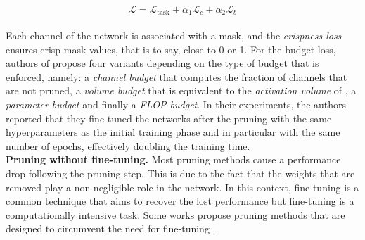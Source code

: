 \begin{equation}
  \label{eqn:chap1:chipnet_loss}
  \mathcal{L} = \mathcal{L}_{\text{task}} + \alpha_1 \mathcal{L}_c + \alpha_2 \mathcal{L}_b
\end{equation}\\




Each channel of the network is associated with a mask, and the \emph{crispness
loss} ensures crisp mask values, that is to say, close to 0 or 1. For the
budget loss, authors of \cite{tiwari2021chipnet} propose four variants depending
on the type of budget that is enforced, namely: a \emph{channel budget} that
computes the fraction of channels that are not pruned, a \emph{volume budget}
that is equivalent to the \emph{activation volume} of
\cite{lemaire2019structured}, a \emph{parameter budget} and finally a
\emph{\ac{FLOP} budget}. In their experiments, the authors reported that they
fine-tuned the networks after the pruning with the same hyperparameters as the
initial training phase and in particular with the same number of epochs,
effectively doubling the training time.\\

\noindent\textbf{Pruning without fine-tuning.} Most pruning methods cause a
performance drop following the pruning step. This is due to the fact that the
weights that are removed play a non-negligible role in the network. In this
context, fine-tuning is a common technique that aims to recover the lost
performance but fine-tuning is a computationally intensive task. Some works
propose pruning methods that are designed to circumvent the need for fine-tuning
\cite{DBLP:conf/nips/HassibiS92,DBLP:conf/icnn/HassibiSW93,DBLP:conf/icml/KangH20}.\\


